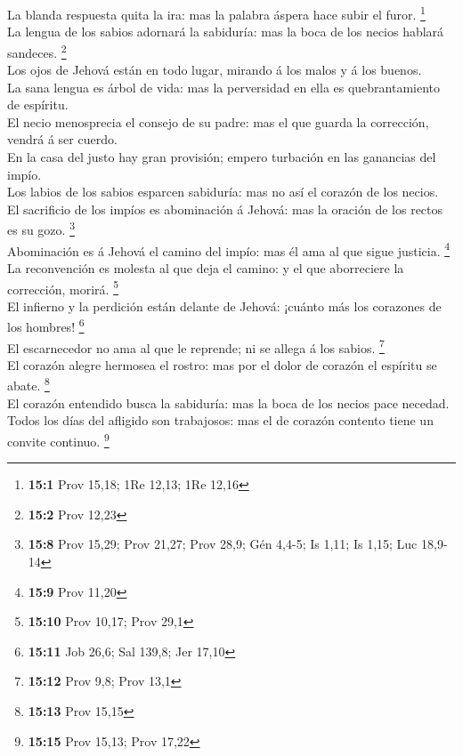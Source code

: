  La blanda respuesta quita la ira: mas la palabra áspera
hace subir el furor. \footnote{\textbf{15:1} Prov 15,18; 1Re 12,13; 1Re
  12,16}\\
 La lengua de los sabios adornará la sabiduría: mas la boca
de los necios hablará sandeces. \footnote{\textbf{15:2} Prov 12,23}\\
 Los ojos de Jehová están en todo lugar, mirando á los malos
y á los buenos.\\
 La sana lengua es árbol de vida: mas la perversidad en ella
es quebrantamiento de espíritu.\\
 El necio menosprecia el consejo de su padre: mas el que
guarda la corrección, vendrá á ser cuerdo.\\
 En la casa del justo hay gran provisión; empero turbación
en las ganancias del impío.\\
 Los labios de los sabios esparcen sabiduría: mas no así el
corazón de los necios.\\
 El sacrificio de los impíos es abominación á Jehová: mas la
oración de los rectos es su gozo. \footnote{\textbf{15:8} Prov 15,29;
  Prov 21,27; Prov 28,9; Gén 4,4-5; Is 1,11; Is 1,15; Luc 18,9-14}\\
 Abominación es á Jehová el camino del impío: mas él ama al
que sigue justicia. \footnote{\textbf{15:9} Prov 11,20}\\
 La reconvención es molesta al que deja el camino: y el que
aborreciere la corrección, morirá. \footnote{\textbf{15:10} Prov 10,17;
  Prov 29,1}\\
 El infierno y la perdición están delante de Jehová:
¡cuánto más los corazones de los hombres! \footnote{\textbf{15:11} Job
  26,6; Sal 139,8; Jer 17,10}\\
 El escarnecedor no ama al que le reprende; ni se allega á
los sabios. \footnote{\textbf{15:12} Prov 9,8; Prov 13,1}\\
 El corazón alegre hermosea el rostro: mas por el dolor de
corazón el espíritu se abate. \footnote{\textbf{15:13} Prov 15,15}\\
 El corazón entendido busca la sabiduría: mas la boca de
los necios pace necedad.\\
 Todos los días del afligido son trabajosos: mas el de
corazón contento tiene un convite continuo. \footnote{\textbf{15:15}
  Prov 15,13; Prov 17,22}\\
